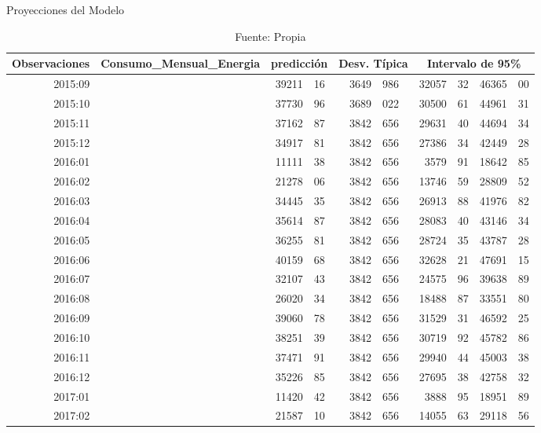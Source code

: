\documentclass[12pt,letterpaper]{report}
\begin{document}
\begin{center}
\begin{table}[htb]
\caption{Proyecciones del Modelo}
\begin{longtable}{%
r%
  r@{.}l%
    r@{.}l%
      r@{.}l%
        r@{.}l%
         r@{.}l}%
Observaciones & \multicolumn{2}{c}{Consumo\_Mensual\_Energia}  & \multicolumn{2}{c}{predicción}
  & \multicolumn{2}{c}{Desv. Típica}
   & \multicolumn{4}{c}{Intervalo de 95\% } \\[1ex]
     \hline
 2015:09  & \multicolumn{2}{c}{} & 39211&16 & 3649&986 & 32057&32 & 46365&00 \\
  \hline
 2015:10  & \multicolumn{2}{c}{} & 37730&96 & 3689&022 & 30500&61 & 44961&31 \\
  \hline
 2015:11  & \multicolumn{2}{c}{} & 37162&87 & 3842&656 & 29631&40 & 44694&34 \\
  \hline
 2015:12  & \multicolumn{2}{c}{} & 34917&81 & 3842&656 & 27386&34 & 42449&28 \\
  \hline
 2016:01  & \multicolumn{2}{c}{} & 11111&38 & 3842&656 & 3579&91 & 18642&85 \\
  \hline
 2016:02  & \multicolumn{2}{c}{} & 21278&06 & 3842&656 & 13746&59 & 28809&52 \\
  \hline
 2016:03  & \multicolumn{2}{c}{} & 34445&35 & 3842&656 & 26913&88 & 41976&82 \\
  \hline
 2016:04  & \multicolumn{2}{c}{} & 35614&87 & 3842&656 & 28083&40 & 43146&34 \\
  \hline
 2016:05  & \multicolumn{2}{c}{} & 36255&81 & 3842&656 & 28724&35 & 43787&28 \\
  \hline
 2016:06  & \multicolumn{2}{c}{} & 40159&68 & 3842&656 & 32628&21 & 47691&15 \\
  \hline
 2016:07  & \multicolumn{2}{c}{} & 32107&43 & 3842&656 & 24575&96 & 39638&89 \\
  \hline
 2016:08  & \multicolumn{2}{c}{} & 26020&34 & 3842&656 & 18488&87 & 33551&80 \\
  \hline
 2016:09  & \multicolumn{2}{c}{} & 39060&78 & 3842&656 & 31529&31 & 46592&25 \\
  \hline
 2016:10  & \multicolumn{2}{c}{} & 38251&39 & 3842&656 & 30719&92 & 45782&86 \\
  \hline
 2016:11  & \multicolumn{2}{c}{} & 37471&91 & 3842&656 & 29940&44 & 45003&38 \\
  \hline
 2016:12  & \multicolumn{2}{c}{} & 35226&85 & 3842&656 & 27695&38 & 42758&32 \\
  \hline
 2017:01  & \multicolumn{2}{c}{} & 11420&42 & 3842&656 & 3888&95 & 18951&89 \\
  \hline
 2017:02  & \multicolumn{2}{c}{} & 21587&10 & 3842&656 & 14055&63 & 29118&56 \\
  \hline
\end{longtable}
\caption*{Fuente: Propia}\label{xDDD}
\end{table}
\end{center}
\end{document}
